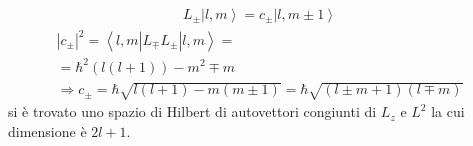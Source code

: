 \begin{equation}\begin{split}
L_\pm\left |l,m \right\rangle=c_\pm\left |l,m\pm 1 \right\rangle
\end{split}\end{equation}
\begin{equation}\begin{split}
|c_\pm|^2=\left\langle l,m|L_\mp L_\pm|l,m \right\rangle=\\
=\hbar ^2\left(l\left(l+1\right)\right)-m^2\mp m \\
\Longrightarrow c_\pm=\hbar \sqrt{l\left(l+1\right)-m\left(m\pm 1\right)}=\hbar \sqrt{\left(l\pm m+1\right)\left(l\mp m\right)}
\end{split}\end{equation}
si è trovato uno spazio di Hilbert di autovettori congiunti di $L_z$ e $L^2$ la cui dimensione è $2l+1$.

